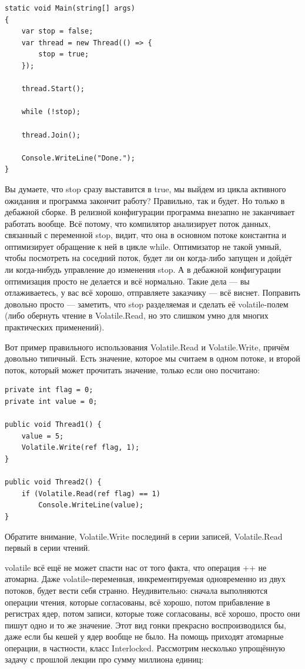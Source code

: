 \documentclass{../../text-style}
\begin{document}
\begin{verbatim}
static void Main(string[] args)
{
    var stop = false;
    var thread = new Thread(() => {
        stop = true;
    });

    thread.Start();

    while (!stop);

    thread.Join();

    Console.WriteLine("Done.");
}
\end{verbatim}

Вы думаете, что stop сразу выставится в true, мы выйдем из цикла активного ожидания и программа закончит работу? Правильно, так и будет. Но только в дебажной сборке. В релизной конфигурации программа внезапно не заканчивает работать вообще. Всё потому, что компилятор анализирует поток данных, связанный с переменной stop, видит, что она в основном потоке константна и оптимизирует обращение к ней в цикле while. Оптимизатор не такой умный, чтобы посмотреть на соседний поток, будет ли он когда-либо запущен и дойдёт ли когда-нибудь управление до изменения stop. А в дебажной конфигурации оптимизация просто не делается и всё нормально. Такие дела --- вы отлаживаетесь, у вас всё хорошо, отправляете заказчику --- всё виснет. Поправить довольно просто --- заметить, что stop разделяемая и сделать её volatile-полем (либо обернуть чтение в Volatile.Read, но это слишком умно для многих практических применений).

Вот пример правильного использования Volatile.Read и Volatile.Write, причём довольно типичный. Есть значение, которое мы считаем в одном потоке, и второй поток, который может прочитать значение, только если оно посчитано:

\begin{verbatim}
private int flag = 0;
private int value = 0;

public void Thread1() {
    value = 5;
    Volatile.Write(ref flag, 1);
}

public void Thread2() {
    if (Volatile.Read(ref flag) == 1)
        Console.WriteLine(value);
}
\end{verbatim}

Обратите внимание, Volatile.Write послединй в серии записей, Volatile.Read первый в серии чтений.

volatile всё ещё не может спасти нас от того факта, что операция ++ не атомарна. Даже volatile-переменная, инкрементируемая одновременно из двух потоков, будет вести себя странно. Неудивительно: сначала выполняются операции чтения, которые согласованы, всё хорошо, потом прибавление в регистрах ядер, потом записи, которые тоже согласованы, всё хорошо, просто они пишут одно и то же значение. Этот вид гонки прекрасно воспроизводился бы, даже если бы кешей у ядер вообще не было. На помощь приходят атомарные операции, в частности, класс Interlocked. Рассмотрим несколько упрощённую задачу с прошлой лекции про сумму миллиона единиц:
\end{document}
